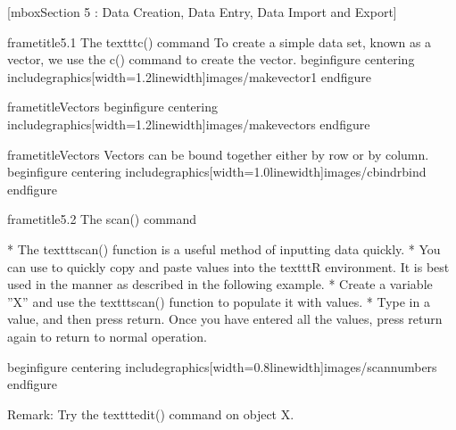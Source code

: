  		[mbox{Section 5 : Data Creation, Data Entry, Data Import and Export}]
 	
 	
 		frametitle{5.1 The texttt{c()} command}
 		To create a simple data set, known as a vector, we use the c() command to create the vector.
 		begin{figure}
 			centering
 			includegraphics[width=1.2linewidth]{images/makevector1}
 		end{figure}
 		
 		
 	
 	
 		frametitle{Vectors}
 		begin{figure}
 			centering
 			includegraphics[width=1.2linewidth]{images/makevectors}
 		end{figure}
 		
 	
 	
 		frametitle{Vectors} 
 		Vectors can be bound together either by row or by column.
 		begin{figure}
 			centering
 			includegraphics[width=1.0linewidth]{images/cbindrbind}
 		end{figure}
 		
 	
 	
 		frametitle{5.2 The scan() command}
 		
 			         * The texttt{scan()} function is a useful method of inputting data quickly. 
 			         * You can use to quickly copy
 			and paste values into the texttt{R} environment. It is best used in the manner as described in the
 			following example. 
 			         * Create a variable ”X” and use the texttt{scan()} function to populate it with
 			values. 
 			         * Type in a value, and then press return. Once you have entered all the values, press
 			return again to return to normal operation.
 		
 	
 	
 		begin{figure}
 			centering
 			includegraphics[width=0.8linewidth]{images/scannumbers}
 		end{figure}
 		
 		Remark: Try the texttt{edit()} command on object X.
 	
 	
